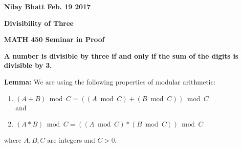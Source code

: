 \documentclass[12pt, fullpage]{article}
\begin{document}
\begin{flushleft}
\textbf{Nilay Bhatt Feb. 19 2017}		
\end{flushleft}

\begin{center}
	\textbf{Divisibility of Three}
\end{center}

\begin{center}
		
{\bf MATH 450 Seminar in Proof}
 \\
\end{center}

\begin{center}
\textbf{A number is divisible by three if and only if the sum of the digits is divisible by 3.}
\end{center}
\textbf{Lemma: }We are using the following properties of modular arithmetic:
\begin{enumerate}
\item
	$(A + B) \bmod C = ((A \bmod C) + (B \bmod C)) \bmod C$
	\\and
\item
	$(A * B) \bmod C = ((A \bmod C) * (B \bmod C)) \bmod C$
\end{enumerate}
where $A,B,C$ are integers and $C > 0$.
\end{document}

